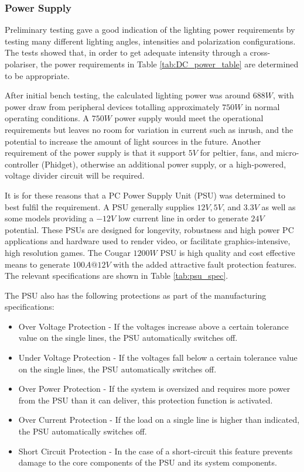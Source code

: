 \documentclass[fleqn,twoside]{article}
\begin{document}
\subsubsection{Power Supply}


Preliminary testing gave a good indication of the lighting power requirements by testing many different lighting angles, intensities and polarization configurations. The tests showed that, in order to get adequate intensity through a cross-polariser, the power requirements in Table \ref{tab:DC_power_table} are determined to be appropriate.

After initial bench testing, the calculated lighting power was around $688W$, with power draw from peripheral devices totalling approximately $750W$ in normal operating conditions. A $750W$ power supply would meet the operational requirements but leaves no room for variation in current such as inrush, and the potential to increase the amount of light sources in the future. Another requirement of the power supply is that it support $5V$ for peltier, fans, and micro-controller (Phidget), otherwise an additional power supply, or a high-powered, voltage divider circuit will be required.

It is for these reasons that a PC Power Supply Unit (PSU) was determined to best fulfil the requirement. A PSU generally supplies $12V, 5V$, and $3.3V$ as well as some models providing a $-12V$ low current line in order to generate $24V$ potential. These PSUs are designed for longevity, robustness and high power PC applications and hardware used to render video, or facilitate graphics-intensive, high resolution games. The Cougar $1200W$ PSU is high quality and cost effective means to generate $100A @ 12V$ with the added attractive fault protection features. The relevant specifications are shown in Table \ref{tab:psu_spec}.


The PSU also has the following protections as part of the manufacturing specifications:

\begin{itemize}
	\item Over Voltage Protection - If the voltages increase above a certain tolerance value on the single lines, the PSU automatically switches off.
	\item Under Voltage Protection - If the voltages fall below a certain tolerance value on the single lines, the PSU automatically switches off.
	\item Over Power Protection - If the system is oversized and requires more power from the PSU than it can deliver, this protection function is activated.
	\item Over Current Protection - If the load on a single line is higher than indicated, the PSU automatically switches off.
	\item Short Circuit Protection - In the case of a short-circuit this feature prevents damage to the core components of the PSU and its system components.
\end{itemize}
\end{document}
